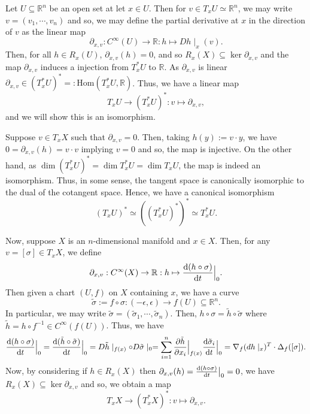 \documentclass[]{article}
\theoremstyle{definition}
\theoremstyle{definition}
\begin{document}
Let \(U \subseteq \mathbb{R}^n\) be an open set at let \(x \in U\). Then for 
\(v \in T_x U \simeq \mathbb{R}^n\), we may write \(v = (v_1, \cdots, v_n)\) 
and so, we may define the partial derivative at \(x\) in the direction 
of \(v\) as the linear map 
\[\partial_{x, v} : C^\infty(U) \to \mathbb{R} : h \mapsto Dh\mid_x(v).\]
Then, for all \(h \in R_x(U)\), \(\partial_{x, v}(h) = 0\), and so 
\(R_x(X) \subseteq \ker \partial_{x, v}\) and the map \(\partial_{x, v}\) induces 
a injection from \(T^*_x U\) to \(\mathbb{R}\). As \(\partial_{x, v}\) is linear 
\(\partial_{x, v} \in (T^*_x U)^* =: \text{Hom}(T^*_x U, \mathbb{R})\). Thus, 
we have a linear map 
\[T_x U \to (T^*_x U)^* : v \mapsto \partial_{x, v},\]
and we will show this is an isomorphism. 

Suppose \(v \in T_x X\) such that \(\partial_{x, v} = 0\). Then, taking 
\(h(y) := v \cdot y\), we have \(0 = \partial_{x, v}(h) = v \cdot v\) implying 
\(v = 0\) and so, the map is injective. On the other hand, as 
\(\dim (T^*_x U)^* = \dim T^*_x U = \dim T_x U\), the map is indeed an 
isomorphism. Thus, in some sense, the tangent space is canonically isomorphic 
to the dual of the cotangent space. Hence, we have a canonical isomorphism 
\[(T_x U)^* \simeq ((T^*_x U)^*)^* \simeq T^*_x U.\]

Now, suppose \(X\) is an \(n\)-dimensional manifold and \(x \in X\). Then, 
for any \(v = [\sigma] \in T_x X\), we define 
\[\partial_{x, v} : C^\infty(X) \to \mathbb{R} : 
  h \mapsto \dv{(h \circ \sigma)}{t}\Big\vert_0.\]
Then given a chart \((U, f)\) on \(X\) containing \(x\), we have a curve 
\[\tilde \sigma := f \circ \sigma : (-\epsilon, \epsilon) \to f(U) 
  \subseteq \mathbb{R}^n.\]
In particular, we may write \(\tilde \sigma = 
(\tilde \sigma_1, \cdots, \tilde \sigma_n)\). Then, \(h \circ \sigma = \tilde h 
\circ \tilde \sigma\) where \(\tilde h = h \circ f^{-1} \in C^\infty(f(U))\).
Thus, we have
\[\dv{(h \circ \sigma)}{t}\Big\vert_0 = \dv{(\tilde h \circ \tilde \sigma)}{t}\Big\vert_0 
  = D \tilde h\mid_{f(x)} \circ D\tilde \sigma\mid_0 = 
  \sum_{i = 1}^n \pdv{\tilde h}{x_i}\Big\vert_{f(x)} \dv{\tilde \sigma_i}{t}\Big\vert_0
  = \nabla_f(dh\mid_x)^T \cdot \Delta_f([\sigma]).\]
Now, by considering if \(h \in R_x(X)\) then \(\partial_{x, v}(h) = 
\dv{(h \circ \sigma)}{t}\big\vert_0 = 0\), we have 
\(R_x(X) \subseteq \ker \partial_{x, v}\) and so, we obtain a map 
\[T_x X \to (T^*_x X)^* : v \mapsto \partial_{x, v}.\]
\end{document}
